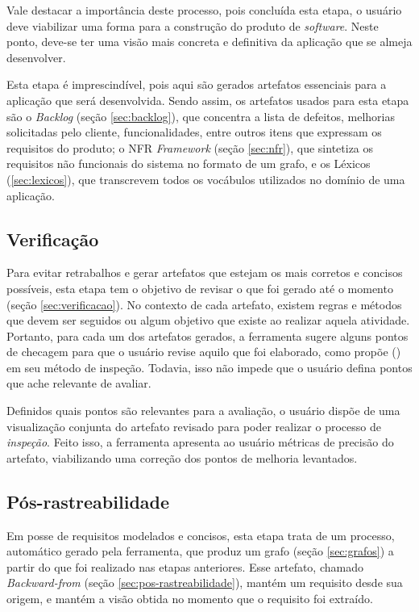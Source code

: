 Vale destacar a importância deste processo, pois concluída esta etapa, o usuário deve viabilizar uma forma para a construção do produto de \textit{software}. Neste ponto, deve-se ter uma visão mais concreta e definitiva da aplicação que se almeja desenvolver.

Esta etapa é imprescindível, pois aqui são gerados artefatos essenciais para a aplicação que será desenvolvida. Sendo assim, os artefatos usados para esta etapa são o \textit{Backlog} (seção \ref{sec:backlog}), que concentra a lista de defeitos, melhorias solicitadas pelo cliente, funcionalidades, entre outros itens que expressam os requisitos do produto; o NFR \textit{Framework} (seção \ref{sec:nfr}), que sintetiza os requisitos não funcionais do sistema no formato de um grafo, e os Léxicos (\ref{sec:lexicos}), que transcrevem todos os vocábulos utilizados no domínio de uma aplicação.

\subsection{Verificação}

Para evitar retrabalhos e gerar artefatos que estejam os mais corretos e concisos possíveis, esta etapa tem o objetivo de revisar o que foi gerado até o momento (seção \ref{sec:verificacao}). No contexto de cada artefato, existem regras e métodos que devem ser seguidos ou algum objetivo que existe ao realizar aquela atividade. Portanto, para cada um dos artefatos gerados, a ferramenta sugere alguns pontos de checagem para que o usuário revise aquilo que foi elaborado, como propõe  (\citeyear{design_fagan}) em seu método de inspeção. Todavia, isso não impede que o usuário defina pontos que ache relevante de avaliar.

Definidos quais pontos são relevantes para a avaliação, o usuário dispõe de uma visualização conjunta do artefato revisado para poder realizar o processo de \textit{inspeção}. Feito isso, a ferramenta apresenta ao usuário métricas de precisão do artefato, viabilizando uma correção dos pontos de melhoria levantados.

\subsection{Pós-rastreabilidade}

Em posse de requisitos modelados e concisos, esta etapa trata de um processo, automático gerado pela ferramenta, que produz um grafo (seção \ref{sec:grafos}) a partir do que foi realizado nas etapas anteriores. Esse artefato, chamado \textit{Backward-from} (seção \ref{sec:pos-rastreabilidade}), mantém um requisito desde sua origem, e mantém a visão obtida no momento que o requisito foi extraído.

